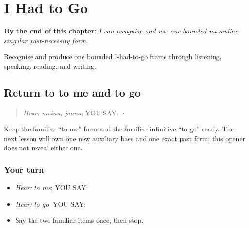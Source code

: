 
\chapter{I Had to Go}
\label{ch:pa-a2-pia}

\begin{chapteropening}
\textbf{By the end of this chapter:} \emph{I can recognise and use one bounded masculine singular past-necessity form.}

Recognise and produce one bounded I-had-to-go frame through listening, speaking, reading, and writing.
\end{chapteropening}

\section[\texorpdfstring{\pa{ਮੈਨੂੰ} · \pa{ਜਾਣਾ} (mainu; jaana)}{ਮੈਨੂੰ · ਜਾਣਾ (mainu; jaana)}]{Return to to me and to go}

\label{lesson:PA-C208-go-return}



\begin{quote}
\emph{Hear:} \emph{mainu; jaana}; YOU SAY: \textbf{ · }
\end{quote}

\begin{grammarlens}[title={Grammar Lens}]
Keep the familiar “to me” form and the familiar infinitive “to go” ready. The next lesson will own one new auxiliary base and one exact past form; this opener does not reveal either one.
\end{grammarlens}

\subsection*{Your turn}
\begin{itemize}
\raggedright
  \item \emph{Hear:} \emph{to me}; YOU SAY: \textbf{}
  \item \emph{Hear:} \emph{to go}; YOU SAY: \textbf{}
  \item Say the two familiar items once, then stop.
\end{itemize}

